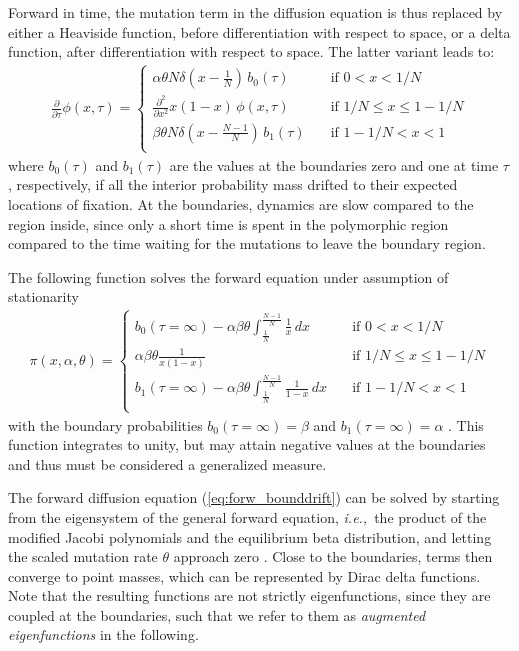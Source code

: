 \documentclass[preprint]{elsarticle}
\newcommand\ie{{\it i.e.,}}
\begin{document}
Forward in time, the mutation term in the diffusion equation is thus replaced by either a Heaviside function, before differentiation with respect to space, or a delta function, after differentiation with respect to space. The latter variant leads to:
\begin{align}\label{eq:forw_bounddrift}
  \frac{\partial}{\partial \tau} \phi(x,\tau) =
  \begin{cases}
    \alpha\theta N\delta(x-\tfrac1N) \,b_0(\tau)  \quad         & \text{if } 0 < x < 1/N         \\
    \frac{\partial^2}{\partial x^2}x(1-x)\,\phi(x,\tau)\, \quad & \text{if } 1/N \le x \le 1-1/N \\
    \beta\theta N\delta(x-\tfrac{N-1}N) \,b_1(\tau)\quad        & \text{if } 1-1/N < x < 1       \\
\end{cases}
\end{align}
where $b_0(\tau)$ and $b_1(\tau)$ are the values at the boundaries zero and one at time $\tau$, respectively, if all the interior probability mass drifted to their expected locations of fixation. At the boundaries, dynamics are slow compared to the region inside, since only a short time is spent in the polymorphic region compared to the time waiting for the mutations to leave the boundary region. 

The following function solves the forward equation under assumption of stationarity
\begin{align}\label{eq:forw_bounddrift}
  \pi(x, \alpha, \theta) =
  \begin{cases}
    b_0(\tau=\infty)-\alpha\beta\theta \int_{\tfrac1N}^{\tfrac{N-1}N} \frac1x\,dx \quad     & \text{if } 0 < x < 1/N         \\
    \alpha\beta\theta\frac{1}{x(1-x)} \quad                                                 & \text{if } 1/N \le x \le 1-1/N \\
    b_1(\tau=\infty)-\alpha\beta\theta \int_{\tfrac1N}^{\tfrac{N-1}N} \frac1{1-x}\,dx \quad & \text{if } 1-1/N < x < 1       \\
\end{cases}
\end{align}
with the boundary probabilities $b_0(\tau=\infty)=\beta$ and $b_1(\tau=\infty)=\alpha$ \citep{Vogl15,Vogl16}. This function integrates to unity, but may attain negative values at the boundaries and thus must be considered a generalized measure. 

The forward diffusion equation (\ref{eq:forw_bounddrift}) can be solved by starting from the eigensystem of the general forward equation, \ie\ the product of the modified Jacobi polynomials \citep{Song12} and the equilibrium beta distribution, and letting the scaled mutation rate $\theta$ approach zero \citep[][Appendix A.1]{Vogl15}. Close to the boundaries, terms then converge to point masses, which can be represented by Dirac delta functions. Note that the resulting functions are not strictly eigenfunctions, since they are coupled at the boundaries, such that we refer to them as \textit{augmented eigenfunctions} in the following. 
\end{document}
